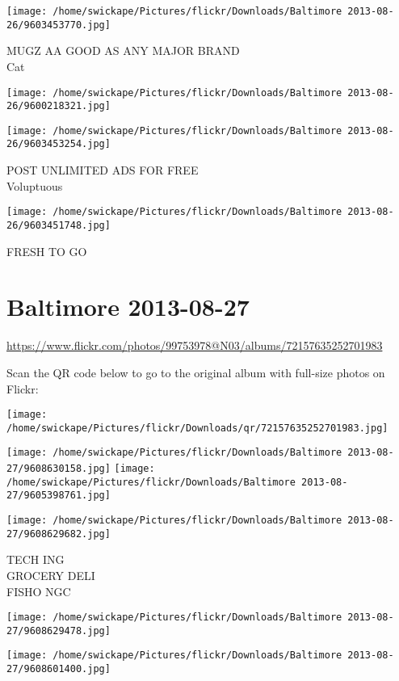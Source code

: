 \documentclass[10pt,letterpaper]{article}
\begin{document}
\vspace{0.25in}
\texttt{[image: /home/swickape/Pictures/flickr/Downloads/Baltimore 2013-08-26/9603453770.jpg]}

MUGZ AA GOOD AS ANY MAJOR BRAND\\
Cat
\pagebreak

\texttt{[image: /home/swickape/Pictures/flickr/Downloads/Baltimore 2013-08-26/9600218321.jpg]}

\vspace{0.25in}
\texttt{[image: /home/swickape/Pictures/flickr/Downloads/Baltimore 2013-08-26/9603453254.jpg]}

POST UNLIMITED ADS FOR FREE\\
Voluptuous
\pagebreak

\texttt{[image: /home/swickape/Pictures/flickr/Downloads/Baltimore 2013-08-26/9603451748.jpg]}

FRESH TO GO
\pagebreak

\section*{Baltimore 2013-08-27}

\url{https://www.flickr.com/photos/99753978@N03/albums/72157635252701983}

Scan the QR code below to go to the original album with full-size photos on Flickr:

\texttt{[image: /home/swickape/Pictures/flickr/Downloads/qr/72157635252701983.jpg]}
\pagebreak

\texttt{[image: /home/swickape/Pictures/flickr/Downloads/Baltimore 2013-08-27/9608630158.jpg]}
\texttt{[image: /home/swickape/Pictures/flickr/Downloads/Baltimore 2013-08-27/9605398761.jpg]}

\texttt{[image: /home/swickape/Pictures/flickr/Downloads/Baltimore 2013-08-27/9608629682.jpg]}

TECH ING\\
GROCERY DELI\\
FISHO NGC
\pagebreak

\texttt{[image: /home/swickape/Pictures/flickr/Downloads/Baltimore 2013-08-27/9608629478.jpg]}

\vspace{0.25in}
\texttt{[image: /home/swickape/Pictures/flickr/Downloads/Baltimore 2013-08-27/9608601400.jpg]}
\end{document}
